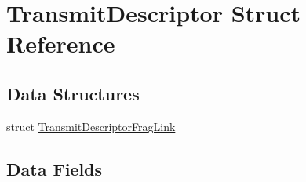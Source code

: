 \hypertarget{structTransmitDescriptor}{}\section{Transmit\+Descriptor Struct Reference}
\label{structTransmitDescriptor}
\subsection*{Data Structures}
\begin{DoxyCompactItemize}
\item 
struct \mbox{\hyperlink{structTransmitDescriptor_1_1TransmitDescriptorFragLink}{Transmit\+Descriptor\+Frag\+Link}}
\end{DoxyCompactItemize}
\subsection*{Data Fields}
